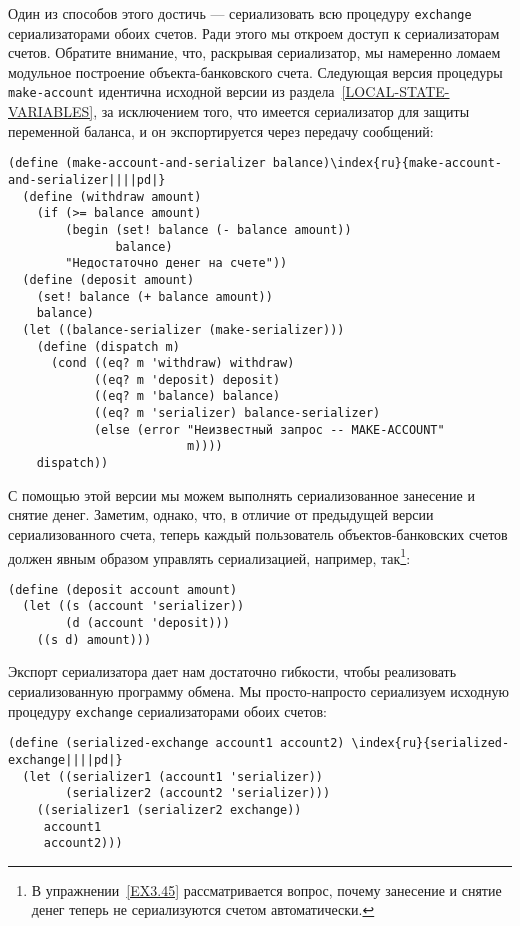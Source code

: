 Один из способов этого достичь --- сериализовать всю
процедуру {\tt exchange} сериализаторами обоих счетов.  Ради
этого мы откроем доступ к сериализаторам счетов.  Обратите внимание,
что, раскрывая сериализатор, мы намеренно ломаем модульное построение
объекта-банковского счета.  Следующая версия процедуры
{\tt make-account} идентична исходной версии из
раздела~\ref{LOCAL-STATE-VARIABLES}, за исключением того, что
имеется сериализатор для защиты переменной баланса, и он
экспортируется через передачу сообщений:

\begin{Verbatim}[fontsize=\small]
(define (make-account-and-serializer balance)\index{ru}{make-account-and-serializer||||pd|}
  (define (withdraw amount)
    (if (>= balance amount)
        (begin (set! balance (- balance amount))
               balance)
        "Недостаточно денег на счете"))
  (define (deposit amount)
    (set! balance (+ balance amount))
    balance)
  (let ((balance-serializer (make-serializer)))
    (define (dispatch m)
      (cond ((eq? m 'withdraw) withdraw)
            ((eq? m 'deposit) deposit)
            ((eq? m 'balance) balance)
            ((eq? m 'serializer) balance-serializer)
            (else (error "Неизвестный запрос -- MAKE-ACCOUNT"
                         m))))
    dispatch))
\end{Verbatim}

С помощью этой версии мы можем выполнять сериализованное
занесение и снятие денег.  Заметим, однако, что, в отличие от
предыдущей версии сериализованного счета, теперь каждый
пользователь объектов-банковских счетов должен явным образом управлять
сериализацией, например, так\footnote{В упражнении~\ref{EX3.45} рассматривается
вопрос, почему занесение и снятие денег теперь не сериализуются счетом
автоматически.}:
\begin{Verbatim}[fontsize=\small]
(define (deposit account amount)
  (let ((s (account 'serializer))
        (d (account 'deposit)))
    ((s d) amount)))
\end{Verbatim}

Экспорт сериализатора дает нам достаточно гибкости,
чтобы реализовать сериализованную программу обмена.  Мы
просто-напросто сериализуем исходную процедуру {\tt exchange}
сериализаторами обоих счетов:

\begin{Verbatim}[fontsize=\small]
(define (serialized-exchange account1 account2) \index{ru}{serialized-exchange||||pd|}
  (let ((serializer1 (account1 'serializer))
        (serializer2 (account2 'serializer)))
    ((serializer1 (serializer2 exchange))
     account1
     account2)))
\end{Verbatim}

